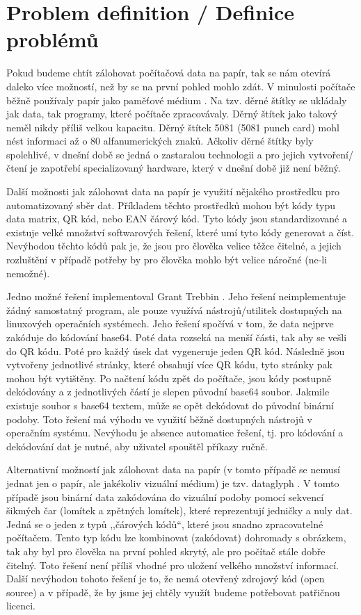 \documentclass[conference]{IEEEtran}
\begin{document}

\section{Problem definition / Definice problémů}

Pokud budeme chtít zálohovat počítačová data na papír, tak se nám otevírá daleko více možností, než by se na první pohled mohlo zdát. V minulosti počítače běžně používaly papír jako paměťové médium \cite{PaperDataStorage}. Na tzv. děrné štítky se ukládaly jak data, tak programy, které počítače zpracovávaly. Děrný štítek jako takový neměl nikdy příliš velkou kapacitu. Děrný štítek 5081 (5081 punch card) mohl nést informaci až o 80 alfanumerických znaků. Ačkoliv děrné štítky byly spolehlivé, v dnešní době se jedná o zastaralou technologii a pro jejich vytvoření/čtení je zapotřebí specializovaný hardware, který v dnešní době již není běžný. 

Další možnosti jak zálohovat data na papír je využití nějakého prostředku pro automatizovaný sběr dat. Příkladem těchto prostředků mohou být kódy typu data matrix, QR kód, nebo EAN čárový kód. Tyto kódy jsou standardizované a existuje velké množství softwarových řešení, které umí tyto kódy generovat a číst. Nevýhodou těchto kódů pak je, že jsou pro člověka velice těžce čitelné, a jejich rozluštění v případě potřeby by pro člověka mohlo být velice náročné (ne-li nemožné).

Jedno možné řešení implementoval Grant Trebbin \cite{GrantTrebbin}. Jeho řešení neimplementuje žádný samostatný program, ale pouze využívá nástrojů/utilitek dostupných na linuxových operačních systémech. Jeho řešení spočívá v tom, že data nejprve zakóduje do kódování base64. Poté data rozseká na menší části, tak aby se vešli do QR kódu. Poté pro každý úsek dat vygeneruje jeden QR kód. Následně jsou vytvořeny jednotlivé stránky, které obsahují více QR kódu, tyto stránky pak mohou být vytištěny. Po načtení kódu zpět do počítače, jsou kódy postupně dekódovány a z jednotlivých částí je slepen původní base64 soubor. Jakmile existuje soubor s base64 textem, může se opět dekódovat do původní binární podoby. Toto řešení má výhodu ve využití běžně dostupných nástrojů v operačním systému. Nevýhodu je absence automatice řešení, tj. pro kódování a dekódování dat je nutné, aby uživatel spouštěl příkazy ručně.

Alternativní možností jak zálohovat data na papír (v tomto případě se nemusí jednat jen o papír, ale jakékoliv vizuální médium) je tzv. dataglyph \cite{DataGlyphsFreePatenstsOnline}\cite{dataglyphs}. V tomto případě jsou binární data zakódována do vizuální podoby pomocí sekvencí šikmých čar (lomítek a zpětných lomítek), které reprezentují jedničky a nuly dat. Jedná se o jeden z typů ,,čárových kódů``, které jsou snadno zpracovatelné počítačem. Tento typ kódu lze kombinovat (zakódovat) dohromady s obrázkem, tak aby byl pro člověka na první pohled skrytý, ale pro počítač stále dobře čitelný. Toto řešení není příliš vhodné pro uložení velkého množství informací. Další nevýhodou tohoto řešení je to, že nemá otevřený zdrojový kód (open source) a v případě, že by jsme jej chtěly využít budeme potřebovat patřičnou licenci.
\end{document}
